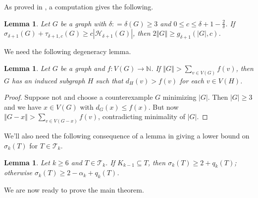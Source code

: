 \documentclass[12pt]{article}
\theoremstyle{plain}
\newtheorem{lem}[thm]{Lemma}
\theoremstyle{definition}
\theoremstyle{remark}
\newcommand{\fancy}[1]{\mathcal{#1}}
\newcommand{\IN}{\mathbb{N}}
\newcommand{\T}{\fancy{T}}
\newcommand{\HH}{\fancy{H}}
\newcommand{\card}[1]{\left|#1\right|}
\newcommand{\size}[1]{\left\Vert#1\right\Vert}
\newcommand{\func}[3]{#1\colon #2 \rightarrow #3}
\newcommand{\DefinedAs}{\mathrel{\mathop:}=}
\begin{document}
\noindent As proved in \cite{kostochkastiebitzedgesincriticalgraph}, a computation gives the following.
\begin{lem}\label{SigmaTauBoundEuler}
Let $G$ be a graph with $\delta \DefinedAs \delta(G) \geq 3$ and $0 \leq c \leq \delta + 1 - \frac{2}{\delta}$.  If $\sigma_{\delta + 1}(G) + \tau_{\delta + 1, c}(G) \geq c\card{\HH_{\delta + 1}(G)}$, then $2\size{G} \geq g_{\delta + 1}(\card{G}, c)$.
\end{lem}

\noindent We need the following degeneracy lemma.
\begin{lem}\label{DegenerateEuler}
Let $G$ be a graph and $\func{f}{V(G)}{\IN}$.  If $\size{G} > \sum_{v \in V(G)} f(v)$, then $G$ has an induced subgraph $H$ such that $d_H(v) > f(v)$ for each $v \in V(H)$.
\end{lem}
\begin{proof}
Suppose not and choose a counterexample $G$ minimizing $\card{G}$. Then $\card{G} \geq 3$ and we have $x \in V(G)$ with $d_G(x) \leq f(x)$. But now $\size{G-x} > \sum_{v \in V(G-x)} f(v)$, contradicting minimality of $\card{G}$.
\end{proof}

We'll also need the following consequence of a lemma in \cite{kostochkastiebitzedgesincriticalgraph} giving a lower bound on $\sigma_k(T)$ for $T \in \T_k$.

\begin{lem}\label{SigmaBoundEuler}
Let $k \geq 6$ and $T \in \T_k$. If $K_{k-1} \subseteq T$, then $\sigma_k(T) \geq 2 + q_k(T)$; otherwise $\sigma_k(T) \geq 2 - \alpha_k + q_k(T)$.
\end{lem}

\noindent We are now ready to prove the main theorem.
\end{document}
